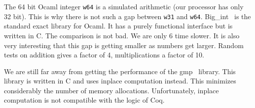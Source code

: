 The 64 bit {\sc Ocaml} integer {\tt w64} is a simulated arithmetic (our processor has only 32 bit).
This is why there is not such a gap between {\tt w31} and {\tt w64}. {\sc Big\_int}~\cite{bignum} is the  
standard exact library for {\sc Ocaml}. It has a purely functional interface but 
is written in C. The comparison is not bad. We are only 6 time slower. It is also very interesting
that this gap is getting smaller as numbers get larger. Random tests on addition gives a factor of
4, multiplications a factor of 10.

We are still far away from getting the performance of the {\sc gmp}~\cite{GMP} library. This library is written in
C and uses inplace computation instead. This minimizes considerably the number of memory allocations.
Unfortunately, inplace computation is not compatible with the logic of {\sc Coq}.

